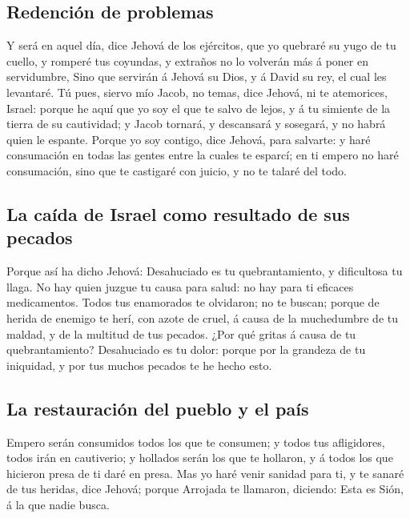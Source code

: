 \hypertarget{redenciuxf3n-de-problemas}{%
\subsection{Redención de problemas}\label{redenciuxf3n-de-problemas}}

 Y será en aquel día, dice Jehová de los ejércitos, que yo
quebraré su yugo de tu cuello, y romperé tus coyundas, y extraños no lo
volverán más á poner en servidumbre,  Sino que servirán á
Jehová su Dios, y á David su rey, el cual les levantaré. 
Tú pues, siervo mío Jacob, no temas, dice Jehová, ni te atemorices,
Israel: porque he aquí que yo soy el que te salvo de lejos, y á tu
simiente de la tierra de su cautividad; y Jacob tornará, y descansará y
sosegará, y no habrá quien le espante.  Porque yo soy
contigo, dice Jehová, para salvarte: y haré consumación en todas las
gentes entre la cuales te esparcí; en ti empero no haré consumación,
sino que te castigaré con juicio, y no te talaré del todo.

\hypertarget{la-cauxedda-de-israel-como-resultado-de-sus-pecados}{%
\subsection{La caída de Israel como resultado de sus
pecados}\label{la-cauxedda-de-israel-como-resultado-de-sus-pecados}}

 Porque así ha dicho Jehová: Desahuciado es tu
quebrantamiento, y dificultosa tu llaga.  No hay quien
juzgue tu causa para salud: no hay para ti eficaces medicamentos.
 Todos tus enamorados te olvidaron; no te buscan; porque
de herida de enemigo te herí, con azote de cruel, á causa de la
muchedumbre de tu maldad, y de la multitud de tus pecados.
 ¿Por qué gritas á causa de tu quebrantamiento?
Desahuciado es tu dolor: porque por la grandeza de tu iniquidad, y por
tus muchos pecados te he hecho esto.

\hypertarget{la-restauraciuxf3n-del-pueblo-y-el-pauxeds}{%
\subsection{La restauración del pueblo y el
país}\label{la-restauraciuxf3n-del-pueblo-y-el-pauxeds}}

 Empero serán consumidos todos los que te consumen; y
todos tus afligidores, todos irán en cautiverio; y hollados serán los
que te hollaron, y á todos los que hicieron presa de ti daré en presa.
 Mas yo haré venir sanidad para ti, y te sanaré de tus
heridas, dice Jehová; porque Arrojada te llamaron, diciendo: Esta es
Sión, á la que nadie busca.

